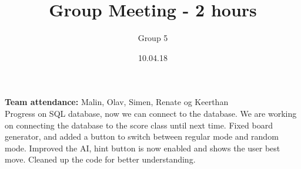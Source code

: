 \documentclass{article}
\title{Group Meeting - 2 hours}
\author{Group 5}
\date{10.04.18}
\begin{document}
	\maketitle
	\noindent
	\textbf{Team attendance:} Malin, Olav, Simen, Renate og Keerthan \\

	\noindent
	Progress on SQL database, now we can connect to the database. We are working on connecting the database to the
	score class until next time. Fixed board generator, and added a button to switch between regular mode and random mode.
	Improved the AI, hint button is now enabled and shows the user best move. Cleaned up the code for better understanding.
	
\end{document}
